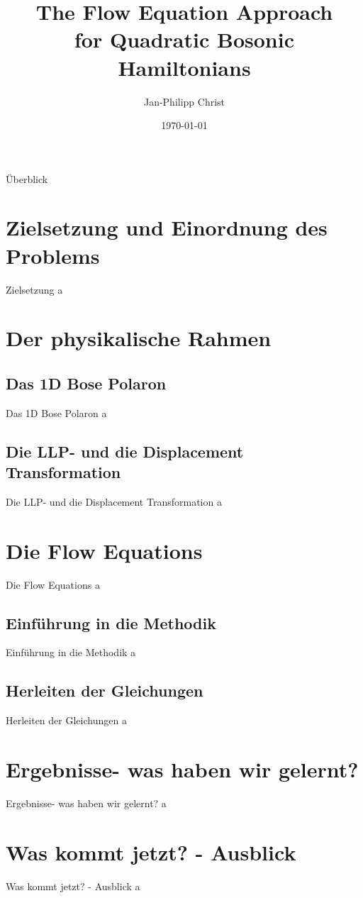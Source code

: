 \documentclass{beamer}
\title{The Flow Equation Approach\\ for Quadratic Bosonic Hamiltonians}
\subtitle{}
\date{\today}
\author{Jan-Philipp Christ}
\institute{LMU München}
\begin{document}
\maketitle

\begin{frame}{Überblick}
\tableofcontents
\end{frame}


\section{Zielsetzung und Einordnung des Problems}
\begin{frame}{Zielsetzung}
 a  
\end{frame}

\section{Der physikalische Rahmen}
\subsection{Das 1D Bose Polaron}
\begin{frame}{Das 1D Bose Polaron}
a
\end{frame}
\subsection{Die LLP- und die Displacement Transformation}
\begin{frame}{Die LLP- und die Displacement Transformation}
a
\end{frame}
\section{Die Flow Equations}
\begin{frame}{Die Flow Equations}
a
\end{frame}
\subsection{Einführung in die Methodik}
\begin{frame}{Einführung in die Methodik}
a
\end{frame}
\subsection{Herleiten der Gleichungen}
\begin{frame}{Herleiten der Gleichungen}
a
\end{frame}
\section{Ergebnisse- was haben wir gelernt?}
\begin{frame}{Ergebnisse- was haben wir gelernt?}
a
\end{frame}
\section{Was kommt jetzt? - Ausblick}
\begin{frame}{Was kommt jetzt? - Ausblick}
a
\end{frame}
\end{document}
